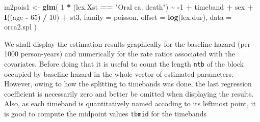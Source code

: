 \documentclass[
]{book}
\newenvironment{Shaded}{\begin{snugshade}}{\end{snugshade}}
\newcommand{\AttributeTok}[1]{\textcolor[rgb]{0.13,0.29,0.53}{#1}}
\newcommand{\CommentTok}[1]{\textcolor[rgb]{0.56,0.35,0.01}{\textit{#1}}}
\newcommand{\DecValTok}[1]{\textcolor[rgb]{0.00,0.00,0.81}{#1}}
\newcommand{\FunctionTok}[1]{\textcolor[rgb]{0.13,0.29,0.53}{\textbf{#1}}}
\newcommand{\NormalTok}[1]{#1}
\newcommand{\OtherTok}[1]{\textcolor[rgb]{0.56,0.35,0.01}{#1}}
\newcommand{\SpecialCharTok}[1]{\textcolor[rgb]{0.81,0.36,0.00}{\textbf{#1}}}
\newcommand{\StringTok}[1]{\textcolor[rgb]{0.31,0.60,0.02}{#1}}
\begin{document}
\begin{Shaded}
\begin{Highlighting}[]
\NormalTok{m2pois1 }\OtherTok{\textless{}{-}} \FunctionTok{glm}\NormalTok{(}
  \DecValTok{1} \SpecialCharTok{*}\NormalTok{ (lex.Xst }\SpecialCharTok{==} \StringTok{"Oral ca. death"}\NormalTok{) }\SpecialCharTok{\textasciitilde{}}
    \SpecialCharTok{{-}}\DecValTok{1} \SpecialCharTok{+}\NormalTok{ timeband }\SpecialCharTok{+}\NormalTok{ sex }\SpecialCharTok{+} \FunctionTok{I}\NormalTok{((age }\SpecialCharTok{{-}} \DecValTok{65}\NormalTok{) }\SpecialCharTok{/} \DecValTok{10}\NormalTok{) }\SpecialCharTok{+}\NormalTok{ st3,}
  \AttributeTok{family =}\NormalTok{ poisson, }\AttributeTok{offset =} \FunctionTok{log}\NormalTok{(lex.dur), }\AttributeTok{data =}\NormalTok{ orca2.spl}
\NormalTok{)}
\end{Highlighting}
\end{Shaded}

We shall display the estimation results graphically
for the baseline hazard (per 1000 person-years)
and numerically for the rate ratios associated with the covariates.
Before doing that it is useful to count the length \texttt{ntb} of the
block occupied by baseline hazard in the whole vector of estimated parameters.
However, owing to how the splitting to timebands was done, the last regression
coefficient is necessarily
zero and better be omitted when displaying the results. Also, as each timeband
is quantitatively
named accoding to its leftmost point, it is good to compute the midpoint values \texttt{tbmid}
for the timebands

\begin{Shaded}
\end{Shaded}
\end{document}
